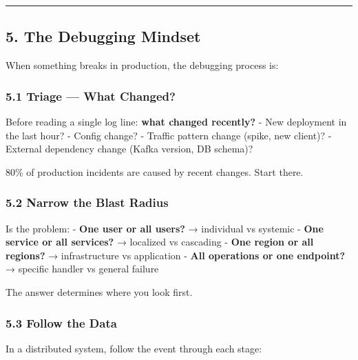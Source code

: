 \documentclass[
]{article}
\begin{document}
\begin{center}\rule{0.5\linewidth}{0.5pt}\end{center}

\hypertarget{the-debugging-mindset}{%
\subsection{5. The Debugging Mindset}\label{the-debugging-mindset}}

When something breaks in production, the debugging process is:

\hypertarget{triage-what-changed}{%
\subsubsection{5.1 Triage --- What Changed?}\label{triage-what-changed}}

Before reading a single log line: \textbf{what changed recently?} - New
deployment in the last hour? - Config change? - Traffic pattern change
(spike, new client)? - External dependency change (Kafka version, DB
schema)?

80\% of production incidents are caused by recent changes. Start there.

\hypertarget{narrow-the-blast-radius}{%
\subsubsection{5.2 Narrow the Blast
Radius}\label{narrow-the-blast-radius}}

Is the problem: - \textbf{One user or all users?} → individual vs
systemic - \textbf{One service or all services?} → localized vs
cascading - \textbf{One region or all regions?} → infrastructure vs
application - \textbf{All operations or one endpoint?} → specific
handler vs general failure

The answer determines where you look first.

\hypertarget{follow-the-data}{%
\subsubsection{5.3 Follow the Data}\label{follow-the-data}}

In a distributed system, follow the event through each stage:
\end{document}
